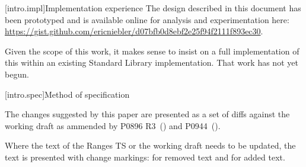 [intro.impl]{Implementation experience}
\pnum
The design described in this document has been prototyped and is available
online for analysis and experimentation here: 
\url{https://gist.github.com/ericniebler/d07bfb0d8ebf2e25f94f2111f893ec30}.

\pnum
Given the scope of this work, it makes sense to insist on a full implementation
of this within an existing Standard Library implementation. That work has not
yet begun.

[intro.spec]{Method of specification}

\pnum
The changes suggested by this paper are presented as a set of diffs against
the working draft as ammended by P0896 R3~(\cite{P0896}) and
P0944~(\cite{P0944}).

\pnum
Where the text of the Ranges TS or the working draft needs to be updated,
the text is presented with change markings:  for
removed text and  for added text.
